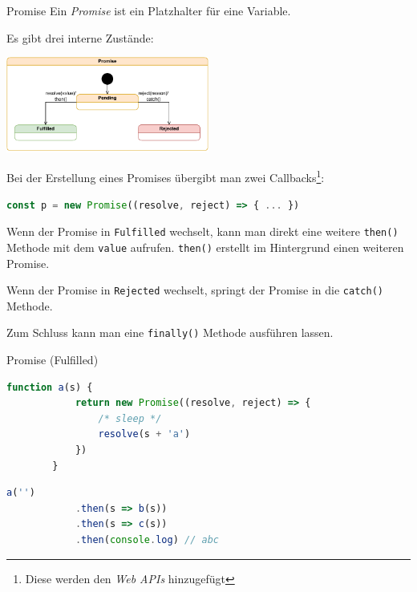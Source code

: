\begin{defi}{Promise}
    Ein \emph{Promise} ist ein Platzhalter für eine Variable.

    Es gibt drei interne Zustände:

    \begin{center}
        \includegraphics[width=0.5\textwidth]{includes/figures/defi_promise.pdf}
    \end{center}

    Bei der Erstellung eines Promises übergibt man zwei Callbacks\footnote{Diese werden den \emph{Web APIs} hinzugefügt}:
    \begin{lstlisting}[language=JavaScript]
        const p = new Promise((resolve, reject) => { ... })
    \end{lstlisting}

    Wenn der Promise in \texttt{Fulfilled} wechselt, kann man direkt eine weitere \texttt{then()} Methode mit dem \texttt{value} aufrufen.
    \texttt{then()} erstellt im Hintergrund einen weiteren Promise.

    Wenn der Promise in \texttt{Rejected} wechselt, springt der Promise in die \texttt{catch()} Methode.

    Zum Schluss kann man eine \texttt{finally()} Methode ausführen lassen.
\end{defi}

\begin{example}{Promise (Fulfilled)}
    \begin{lstlisting}[language=JavaScript]
        function a(s) {
            return new Promise((resolve, reject) => {
                /* sleep */
                resolve(s + 'a')
            })
        }
    \end{lstlisting}

    \begin{lstlisting}[language=JavaScript]
        a('')
            .then(s => b(s))
            .then(s => c(s))
            .then(console.log) // abc
    \end{lstlisting}
\end{example}

